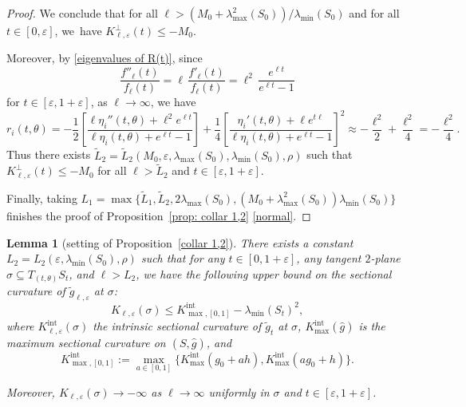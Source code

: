 \documentclass[JEP,XML,SOM,Unicode,NoFloatCountersInSection]{cedram}
\newcommand{\Int}{\mathrm{int}}
\newtheorem{lemma}[theorem]{Lemma}
\theoremstyle{definition}
\let\eps\varepsilon
\renewcommand{\>}{{\rangle}}
\newcommand{\<}{{\langle}}
\begin{document}
\begin{proof}
We conclude that for all $\ell>({M_0+\lambda^2_{\max}(S_0)})/{\lambda_{\min}(S_0)}$ and for all $t\in[0,\eps]$, we~have $K^\perp_{\ell,\eps}(t)\leq -M_0$.

Moreover, by \eqref{eigenvalues of R(t)}, since
\[
\frac{f''_\ell(t)}{f_\ell(t)}=\ell\,\frac{f'_\ell(t)}{f_\ell(t)}=\ell^2\,\frac{e^{\ell t}}{e^{\ell t}-1}
\]
for $t\in[\eps,1+\eps]$, as $\ell\to\infty$, we have
\[
r_i(t,\theta)=-\frac{1}{2}\left[\frac{\ell\eta_i''(t,\theta)+\ell^2e^{\ell t}}{\ell\eta_i(t,\theta)+e^{\ell t}-1}\right]+\frac{1}{4}\left[\frac{\eta_i'(t,\theta)+\ell e^{t\ell}}{\ell\eta_i(t,\theta)+e^{\ell t}-1}\right]^2\approx -\frac{\ell^2}{2}+\frac{\ell^2}{4}=-\frac{\ell^2}{4}.
\]
Thus there exists $\tilde L_2=\tilde L_2(M_0,\eps, \lambda_{\max}(S_0), \lambda_{\min}(S_0), \rho)$ such that $K^\perp_{\ell,\eps}(t)\leq-M_0$ for all $\ell>\tilde L_2$ and $t\in[\eps,1+\eps]$.

Finally, taking $L_1 = \max\{\tilde L_1, \tilde L_2,2\lambda_{\max}(S_0),({M_0+\lambda^2_{\max}(S_0)}){\lambda_{\min}(S_0)}\}$ finishes the proof of Proposition~\ref{prop: collar 1,2} \eqref{normal}.
\end{proof}


\skpt
\begin{lemma}[setting of Proposition~\ref{collar 1,2}]\label{lem: bound_level_curv_C12}
There exists a constant \hbox{$L_2=L_2(\eps, \lambda_{\min}(S_0),\rho)$} such that for any $t\in [0,1+\eps]$, any tangent $2$-plane $\sigma\subseteq T_{(t,\theta)}S_t$, and $\ell>L_2$, we have the following upper bound on the sectional curvature of $\tilde g_{\ell,\eps}$ at $\sigma$:
\begin{equation*}
K_{\ell,\eps}(\sigma)\leq K^{\Int}_{\max,[0,1]}-\lambda_{\min}(S_t)^2,
\end{equation*} where $K^{\Int}_{\ell,\eps}(\sigma)$ the intrinsic sectional curvature of $\tilde{g}_t$ at $\sigma$, $K^{\Int}_{\max}(\hat g)$ is the maximum sectional curvature on $(S,\hat g)$, and
\begin{equation*}
K^{\Int}_{\max,[0,1]} := \max_{a\in[0,1]}\{K^{\Int}_{\max}(g_0+a h), K^{\Int}_{\max}(ag_0+h) \}.
\end{equation*}

Moreover, $K_{\ell,\eps}(\sigma)\to -\infty$ as $\ell\to\infty$ uniformly in $\sigma$ and $t\in[\eps, 1+\eps]$.
\end{lemma}
\end{document}
